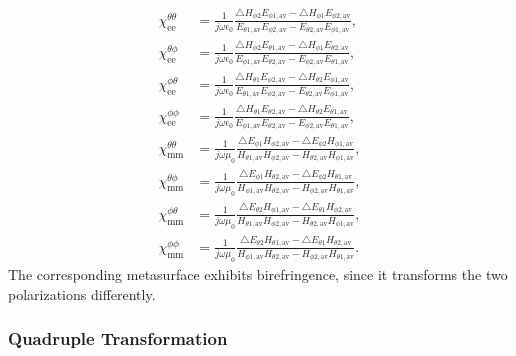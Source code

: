 \documentclass[journal,transaction]{IEEEtran}
\begin{document}
\begin{subequations}\label{Eq:doublechi}
  \begin{align}
  \chi^{\theta \theta}_\text{ee} & =\frac{1}{j\omega\epsilon_0}\frac{\triangle H_{\phi2} E_{\phi1,\text{av}}-\triangle H_{\phi1} E_{\phi2,\text{av}}}{ E_{\theta1,\text{av}}E_{\phi2,\text{av}}-E_{\theta2,\text{av}}E_{\phi1,\text{av}}},\\
\chi^{\theta \phi}_\text{ee} & =\frac{1}{j\omega\epsilon_0}\frac{\triangle H_{\phi2} E_{\theta1,\text{av}}-\triangle H_{\phi1} E_{\theta2,\text{av}}}{ E_{\phi1,\text{av}}E_{\theta2,\text{av}}-E_{\phi2,\text{av}}E_{\theta1,\text{av}}},\\
  \chi^{\phi \theta}_\text{ee} & =\frac{1}{j\omega\epsilon_0}\frac{\triangle H_{\theta1} E_{\phi2,\text{av}}-\triangle H_{\theta2} E_{\phi1,\text{av}}}{ E_{\theta1,\text{av}}E_{\phi2,\text{av}}-E_{\theta2,\text{av}}E_{\phi1,\text{av}}},\\
\chi^{\phi \phi}_\text{ee} & =\frac{1}{j\omega\epsilon_0}\frac{\triangle H_{\theta1} E_{\theta2,\text{av}}-\triangle H_{\theta2} E_{\theta1,\text{av}}}{ E_{\phi1,\text{av}}E_{\theta2,\text{av}}-E_{\phi2,\text{av}}E_{\theta1,\text{av}}},\\
\chi^{\theta \theta}_\text{mm} & =\frac{1}{j\omega\mu_0}\frac{\triangle E_{\phi1} H_{\phi2,\text{av}}-\triangle E_{\phi2} H_{\phi1,\text{av}}}{ H_{\theta1,\text{av}}H_{\phi2,\text{av}}-H_{\theta2,\text{av}}H_{\phi1,\text{av}}},\\
 \chi^{\theta \phi}_\text{mm} & =\frac{1}{j\omega\mu_0}\frac{\triangle E_{\phi1} H_{\theta2,\text{av}}-\triangle E_{\phi2} H_{\theta1,\text{av}}}{ H_{\phi1,\text{av}}H_{\theta2,\text{av}}-H_{\phi2,\text{av}}H_{\theta1,\text{av}}},\\
  \chi^{\phi \theta}_\text{mm} & =\frac{1}{j\omega\mu_0}\frac{\triangle E_{\theta2} H_{\phi1,\text{av}}-\triangle E_{\theta1} H_{\phi2,\text{av}}}{ H_{\theta1,\text{av}}H_{\phi2,\text{av}}-H_{\theta2,\text{av}}H_{\phi1,\text{av}}},\\
 \chi^{\phi \phi}_\text{mm} & =\frac{1}{j\omega\mu_0}\frac{\triangle E_{\theta2} H_{\theta1,\text{av}}-\triangle E_{\theta1} H_{\theta2,\text{av}}}{ H_{\phi1,\text{av}}H_{\theta2,\text{av}}-H_{\phi2,\text{av}}H_{\theta1,\text{av}}}.
\end{align}
\end{subequations}
%
The corresponding metasurface exhibits birefringence, since it transforms the two polarizations differently.


\subsubsection{Quadruple Transformation}
\end{document}
